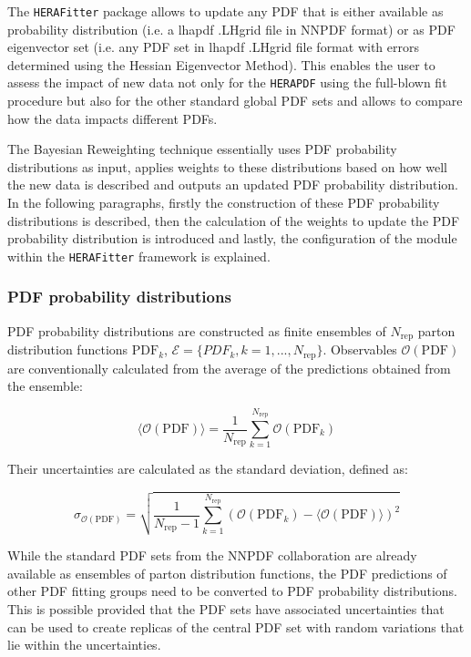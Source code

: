 \documentclass[11pt,a4paper]{article}
\newcommand\fitter{ \mbox{\tt HERAFitter} }
\begin{document}
The \fitter package allows to update any PDF that is either available as probability distribution (i.e. a lhapdf .LHgrid file in NNPDF format) or as PDF eigenvector set (i.e. any PDF set in lhapdf .LHgrid file format with errors determined using the Hessian Eigenvector Method). This enables the user to assess the impact of new data not only for the {\tt HERAPDF} using the full-blown fit procedure but also for the other standard global PDF sets and allows to compare how the data impacts different PDFs.

The Bayesian Reweighting technique essentially uses PDF probability distributions as input, applies weights to these distributions based on how well the new data is described and outputs an updated PDF probability distribution. In the following paragraphs, firstly the construction of these PDF probability distributions is described, then the calculation of the weights to update the PDF probability distribution is introduced and lastly, the configuration of the module within the \fitter framework is explained.

\subsubsection{PDF probability distributions}

PDF probability distributions are constructed as finite ensembles of $N_{\mathrm{rep}}$ parton distribution functions $\mathrm{PDF}_k$, $\mathcal{E} = \{PDF_k, k = 1, . . . ,N_{\mathrm{rep}}\}$. Observables $\mathcal{O}(\mathrm{PDF})$ are conventionally calculated from the average of the predictions obtained from the ensemble:

\begin{equation}
 \langle\mathcal{O}(\mathrm{PDF})\rangle = \frac{1}{N_{\mathrm{rep}}} \sum_{k=1}^{N_{\mathrm{rep}}} \mathcal{O}(\mathrm{PDF}_k)
\label{eq:meanReplicas}
\end{equation}
 
Their uncertainties are calculated as the standard deviation, defined as:

\begin{equation}
\sigma_{\mathcal{O}(\mathrm{PDF})} = \sqrt{  \frac{1}{N_{\mathrm{rep}} - 1 }  \sum_{k=1}^{N_{\mathrm{rep}}} 
( \mathcal{O}(\mathrm{PDF}_k) - \langle \mathcal{O}(\mathrm{PDF})  \rangle   )^2     
     }
\end{equation}

While the standard PDF sets from the NNPDF collaboration are already available as ensembles of parton distribution functions, the PDF predictions of other PDF fitting groups need to be converted to PDF probability distributions. This is possible provided that the PDF sets have associated uncertainties that can be used to create replicas of the central PDF set with random variations that lie within the uncertainties. 
\end{document}

